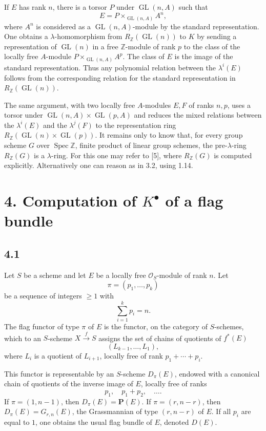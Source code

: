 \documentclass[11pt]{article}
\newcommand{\Spec}{\operatorname{Spec}}
\providecommand{\GL}{\operatorname{GL}}
\begin{document}
If \(E\) has rank \(n\), there is a torsor \(P\) under \(\GL(n,A)\) such that
\[
  E=P\times_{\GL(n,A)} A^n,
\]
where \(A^n\) is considered as a \(\GL(n,A)\)-module by the standard representation. One obtains a \(\lambda\)-homomorphism from \(R_{\mathbb Z}(\GL(n))\) to \(K\) by sending a representation of \(\GL(n)\) in a free \(\mathbb Z\)-module of rank \(p\) to the class of the locally free \(A\)-module \(P\times_{\GL(n,A)}A^p\). The class of \(E\) is the image of the standard representation. Thus any polynomial relation between the \(\lambda^i(E)\) follows from the corresponding relation for the standard representation in \(R_{\mathbb Z}(\GL(n))\).

The same argument, with two locally free \(A\)-modules \(E,F\) of ranks \(n,p\), uses a torsor under \(\GL(n,A)\times\GL(p,A)\) and reduces the mixed relations between the \(\lambda^i(E)\) and the \(\lambda^j(F)\) to the representation ring \(R_{\mathbb Z}(\GL(n)\times\GL(p))\). It remains only to know that, for every group scheme \(G\) over \(\Spec\mathbb Z\), finite product of linear group schemes, the pre-\(\lambda\)-ring \(R_{\mathbb Z}(G)\) is a \(\lambda\)-ring. For this one may refer to [5], where \(R_{\mathbb Z}(G)\) is computed explicitly. Alternatively one can reason as in 3.2, using 1.14.

\section*{4. Computation of \(K^\bullet\) of a flag bundle}

\subsection*{4.1}
Let \(S\) be a scheme and let \(E\) be a locally free \(\mathcal O_S\)-module of rank \(n\). Let
\[
  \pi=(p_1,\ldots,p_k)
\]
be a sequence of integers \(\geq1\) with
\[
  \sum_{i=1}^{k}p_i=n.
\]
The flag functor of type \(\pi\) of \(E\) is the functor, on the category of \(S\)-schemes, which to an \(S\)-scheme \(X\xrightarrow f S\) assigns the set of chains of quotients of \(f^*(E)\)
\[
  (L_{k-1},\ldots,L_1),
\]
where \(L_i\) is a quotient of \(L_{i+1}\), locally free of rank \(p_1+\cdots+p_i\).

This functor is representable by an \(S\)-scheme \(D_\pi(E)\), endowed with a canonical chain of quotients of the inverse image of \(E\), locally free of ranks
\[
  p_1,\quad p_1+p_2,\quad \ldots .
\]
If \(\pi=(1,n-1)\), then \(D_\pi(E)=\mathbf P(E)\). If \(\pi=(r,n-r)\), then \(D_\pi(E)=G_{r,n}(E)\), the Grassmannian of type \((r,n-r)\) of \(E\). If all \(p_i\) are equal to \(1\), one obtains the usual flag bundle of \(E\), denoted \(D(E)\).
\end{document}
